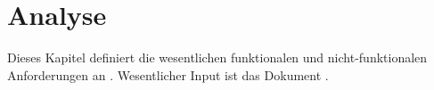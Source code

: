 
\part{Analyse}
\label{sec:Analyse}

Dieses Kapitel definiert die wesentlichen funktionalen und nicht-funktionalen Anforderungen an \LibName{}.
Wesentlicher Input ist das Dokument \cite{MetaComp}.






%
%
